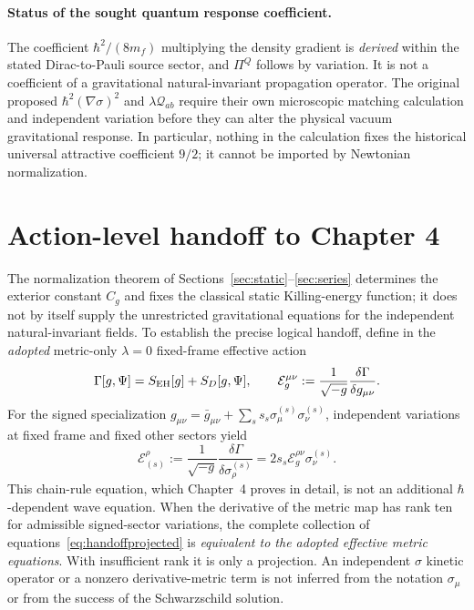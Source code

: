 \documentclass[11pt,a4paper,oneside]{report}
\numberwithin{equation}{chapter}
\theoremstyle{definition}\newtheorem{definition}[theorem]{Definition}
\theoremstyle{remark}\newtheorem{remark}[theorem]{Remark}
\begin{document}
\paragraph{Status of the sought quantum response coefficient.}
The coefficient $\hbar^2/(8m_f)$ multiplying the density gradient is \emph{derived} within the stated Dirac-to-Pauli source sector, and $\Pi^Q$ follows by variation. It is not a coefficient of a gravitational natural-invariant propagation operator. The original proposed $\hbar^2(\nabla\sigma)^2$ and $\lambda\mathcal Q_{ab}$ require their own microscopic matching calculation and independent variation before they can alter the physical vacuum gravitational response. In particular, nothing in the calculation fixes the historical universal attractive coefficient $9/2$; it cannot be imported by Newtonian normalization.


\section{Action-level handoff to Chapter 4}\label{sec:handoff4}
The normalization theorem of Sections~\ref{sec:static}--\ref{sec:series}
determines the exterior constant $C_g$ and fixes the classical static
Killing-energy function; it does not by itself supply the unrestricted
gravitational equations for the independent natural-invariant fields.
To establish the precise logical handoff, define in the \emph{adopted}
metric-only $\lambda=0$ fixed-frame effective action
\begin{equation}
 \Gamma[g,\Psi]=S_{\rm EH}[g]+S_D[g,\Psi],\qquad
 \mathcal E_g^{\mu\nu}:=\frac{1}{\sqrt{-g}}
 \frac{\delta\Gamma}{\delta g_{\mu\nu}}.
 \label{eq:handoffmetric}
\end{equation}
For the signed specialization
$g_{\mu\nu}=\bar g_{\mu\nu}+\sum_s s_s\sigma^{(s)}_\mu\sigma^{(s)}_\nu$,
independent variations at fixed frame and fixed other sectors yield
\begin{equation}
 \boxed{\displaystyle
 \mathcal E_{(s)}^\rho:=\frac{1}{\sqrt{-g}}
 \frac{\delta\Gamma}{\delta\sigma_\rho^{(s)}}
 =2s_s\mathcal E_g^{\rho\nu}\sigma_\nu^{(s)}.}
 \label{eq:handoffprojected}
\end{equation}
This chain-rule equation, which Chapter~4 proves in detail, is not an
additional $\hbar$-dependent wave equation. When the derivative of the
metric map has rank ten for admissible signed-sector variations, the
complete collection of equations~\eqref{eq:handoffprojected} is
\emph{equivalent to the adopted effective metric equations}. With
insufficient rank it is only a projection. An independent $\sigma$
kinetic operator or a nonzero derivative-metric term is not inferred
from the notation $\sigma_\mu$ or from the success of the Schwarzschild
solution.
\end{document}

